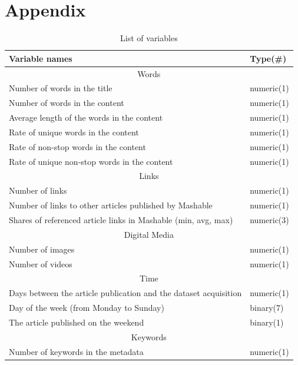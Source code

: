 \documentclass[11pt]{article}
\begin{document}
\section{Appendix}

    \begin{table}[h]
        \centering
        \caption{List of variables}
        \begin{tabular}{ l | l }
            \hline\hline
            Variable names & Type(\#)\\
            \hline
            \multicolumn{2}{c}{Words}\\
            \hline
            Number of words in the title & numeric(1) \\
            Number of words in the content & numeric(1) \\
            Average length of the words in the content & numeric(1) \\
            Rate of unique words in the content & numeric(1) \\
            Rate of non-stop words in the content & numeric(1) \\
            Rate of unique non-stop words in the content & numeric(1) \\
            \hline
            \multicolumn{2}{c}{Links}\\
            \hline
            Number of links & numeric(1) \\
            Number of links to other articles published by Mashable & numeric(1) \\
            Shares of referenced article links in Mashable (min, avg, max) & numeric(3) \\
            \hline
            \multicolumn{2}{c}{Digital Media}\\
            \hline
            Number of images & numeric(1) \\
            Number of videos & numeric(1) \\
            \hline
            \multicolumn{2}{c}{Time}\\
            \hline
            Days between the article publication and the dataset acquisition & numeric(1) \\
            Day of the week (from Monday to Sunday) & binary(7) \\
            The article published on the weekend & binary(1) \\
            \hline
            \multicolumn{2}{c}{Keywords}\\
            \hline
            Number of keywords in the metadata & numeric(1) \\

\end{tabular}
\end{table}
\end{document}
